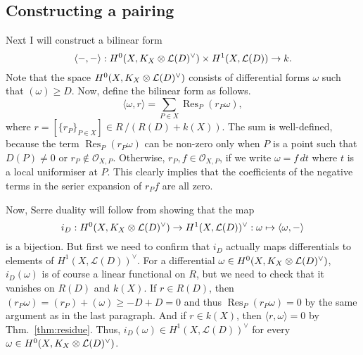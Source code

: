 \documentclass[12pt]{article}
\DeclareMathOperator{\res}{Res}
\begin{document}
\subsection{Constructing a pairing}
Next I will construct a bilinear form
\[
  \langle -,-\rangle:H^0(X,K_X\otimes\mathcal{L}(D)^{\vee})\times H^{1}(X,\mathcal{L}(D))\to k.
\]
Note that the space $H^0(X,K_X\otimes\mathcal{L}(D)^{\vee})$ consists of differential forms $\omega$
such that $(\omega)\geq D$.
Now, define the bilinear form as follows.
\[
  \langle\omega,r\rangle=\sum_{P\in X}\res_{P}(r_{P}\omega),
\]
where $r=[\{r_{P}\}_{P\in X}]\in R\,/\left(R(D)+k(X)\right)$. The sum is
well-defined, because the term $\res_{P}(r_{P}\omega)$ can be non-zero only
when $P$ is a point such that $D(P)\neq 0$ or $r_{P}\not\in\mathscr{O}_{X,P}$.
Otherwise, $r_{P},f\in\mathscr{O}_{X,P}$, if we write $\omega=f\,dt$
where $t$ is a local uniformiser at $P$. This clearly implies that the
coefficients of the negative terms in the serier expansion of $r_{P}f$
are all zero.

Now, Serre duality will follow from showing that the map
\[
  i_{D}:H^0(X,K_X\otimes\mathcal{L}(D)^{\vee})\to H^{1}(X,\mathcal{L}(D))^{\vee}
  :\omega\mapsto\langle\omega,-\rangle
\]
is a bijection. But first we need to confirm that $i_{D}$ actually maps
differentials to elements of $H^{1}(X,\mathcal{L}(D))^{\vee}$. For a
differential $\omega\in H^0(X,K_X\otimes\mathcal{L}(D)^{\vee})$, $i_{D}(\omega)$ is of course a linear
functional on $R$, but we need to check that it vanishes on $R(D)$ and
$k(X)$. If $r\in R(D)$, then $(r_{P}\omega)=(r_{P})+(\omega)\geq -D+D=0$
and thus $\res_{P}(r_{P}\omega)=0$ by the same argument as in the last
paragraph. And if $r\in k(X)$, then $\langle r,\omega\rangle=0$ by
Thm.~\ref{thm:residue}. Thus, $i_{D}(\omega)\in H^{1}(X,\mathcal{L}(D))^{\vee}$
for every $\omega\in H^0(X,K_X\otimes\mathcal{L}(D)^{\vee})$.
\end{document}
